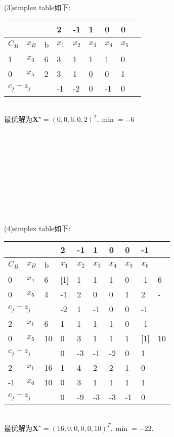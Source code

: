\documentclass[12pt]{article}
\begin{document}
(3)simplex table如下:
\begin{table}[h]
    \centering
    \begin{tabular}{l|l|l|lllll|l}
    \multicolumn{3}{l|}{} & 2  & -1 & 1 & 0 & 0 &  \\ \hline
    $C_B$  &  $x_B$ &  b  &  $x_1$  & $x_2$ & $x_3$ & $x_4$ & $x_5$ &  \\ \hline
    1      &  $x_3$    & 6     & 3  & 1  & 1 & 1 & 0 &  \\
    0      &    $x_5$  & 2     & 3 & 1  & 0 & 0 & 1 &  \\ \hline
    \multicolumn{3}{l|}{$c_j-z_j$} & -1  & -2 & 0 & -1 & 0 & 
    \end{tabular}
    \end{table}\\
最优解为$\boldsymbol X^{\star}=(0,0,6,0,2)^{T},\min =-6$\\
\\
\\
\\
\\
\\
\\
\\
\\
\\
\\
(4)simplex table如下:
\begin{table}[h]
    \centering
    \begin{tabular}{l|l|l|llllll|l}
    \hline
    \multicolumn{3}{l|}{} & 2 & -1 &  1 & 0 & 0 & -1 &   \\ \hline
    $C_B$   &   $x_B$ &  b  &  $x_1$ & $x_2$  &  $x_3$   & $x_4$ & $x_5$ & $x_6$ &   \\ \hline
    0      &   $x_4$  & 6   & [1]  & 1 & 1  & 1 & 0 & -1 & 6 \\
    0      &   $x_5$  & 4   & -1 & 2 & 0  & 0 & 1 & 2  & - \\ \hline
    \multicolumn{3}{l|}{$c_j-z_j$} & -2 & 1 & -1 & 0 & 0 & -1 &   \\ \hline
    2      &   $x_1$   & 6  &  1  & 1 & 1  & 1 &  0 & -1 & -  \\
    0      &   $x_5$   & 10  &  0  & 3 & 1  & 1 & 1 & [1]  & 10 \\ \hline
    \multicolumn{3}{l|}{$c_j-z_j$} & 0  & -3 &  -1 &  -2 & 0 &  1 &   \\ \hline
    2     &   $x_1$   & 16  &  1  & 4 & 2  & 2 &  1 & 0 &   \\
    -1      &   $x_6$   & 10  &  0  & 3 & 1  & 1 & 1 & 1  &  \\ \hline
    \multicolumn{3}{l|}{$c_j-z_j$} & 0  & -9 &  -3 &  -3 & -1 &  0 &   \\ \hline
    \end{tabular}
    \end{table}\\
最优解为$\boldsymbol X^{\star}=(16,0,0,0,0,10)^{T},\min =-22$.\\


 
\end{document}
